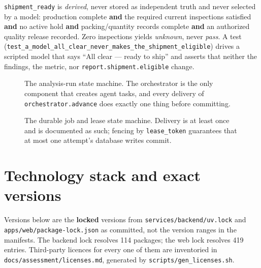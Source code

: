 \documentclass[11pt,a4paper]{article}
\begin{document}
\texttt{shipment\_ready} is \emph{derived}, never stored as independent truth
and never selected by a model: production complete \textbf{and} the required
current inspections satisfied \textbf{and} no active hold \textbf{and}
packing/quantity records complete \textbf{and} an authorized quality release
recorded. Zero inspections yields \emph{unknown}, never \emph{pass}. A test
(\texttt{test\_a\_model\_all\_clear\_never\_makes\_the\_shipment\_eligible})
drives a scripted model that says ``All clear --- ready to ship'' and asserts
that neither the findings, the metric, nor \texttt{report.shipment.eligible}
change.

\begin{figure}[p]
\centering
\resizebox{\textwidth}{!}{}
\caption{The analysis-run state machine. The orchestrator is the only component
that creates agent tasks, and every delivery of \texttt{orchestrator.advance}
does exactly one thing before committing.}
\label{fig:runstate}
\end{figure}

\begin{figure}[p]
\centering
\resizebox{\textwidth}{!}{}
\caption{The durable job and lease state machine. Delivery is at least once and
is documented as such; fencing by \texttt{lease\_token} guarantees that at most
one attempt's database writes commit.}
\label{fig:jobstate}
\end{figure}

\clearpage
\section{Technology stack and exact versions}

Versions below are the \textbf{locked} versions from
\texttt{services/backend/uv.lock} and \texttt{apps/web/package-lock.json} as
committed, not the version ranges in the manifests. The backend lock resolves
114 packages; the web lock resolves 419 entries. Third-party licences for every
one of them are inventoried in \texttt{docs/assessment/licenses.md}, generated
by \texttt{scripts/gen\_licenses.sh}.
\end{document}
